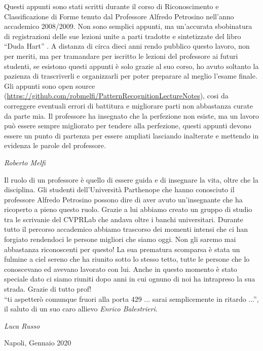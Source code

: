 %
%
%

\preface

Questi appunti sono stati scritti durante il corso di Riconoscimento e Classificazione di Forme tenuto dal Professore Alfredo Petrosino nell’anno accademico 2008/2009. Non sono semplici appunti, ma un’accurata sbobinatura di registrazioni delle sue lezioni unite a parti tradotte e sintetizzate del libro “Duda Hart” \cite{duda}. 
A distanza di circa dieci anni rendo pubblico questo lavoro, non per meriti, ma per tramandare per iscritto le lezioni del professore ai futuri studenti, se esistono questi appunti è solo grazie al suo corso, ho avuto soltanto la pazienza di trascriverli e organizzarli per poter preparare al meglio l’esame finale. \\
Gli appunti sono open source (\url{https://github.com/robmelfi/PatternRecognitionLectureNotes}), cosi da correggere eventuali errori di battitura e migliorare parti non abbastanza curate da parte mia. 
Il professore ha insegnato che la perfezione non esiste, ma un lavoro può essere sempre migliorato per tendere alla perfezione, questi appunti devono essere un punto di partenza per essere ampliati lasciando inalterate e mettendo in evidenza le parole del professore. 




\begin{flushright}\noindent
\hfill {\it Roberto Melfi}\\
\end{flushright}

\vspace{1cm}
\noindent Il ruolo di un professore è quello di essere guida e di insegnare la vita, oltre che la disciplina.
Gli studenti dell’Università Parthenope che hanno conosciuto il professore Alfredo Petrosino possono dire di aver avuto un’insegnante che ha ricoperto a pieno questo ruolo.
Grazie a lui abbiamo creato un gruppo di studio tra le scrivanie del CVPRLab che andava oltre i banchi universitari.
Durante tutto il percorso accademico abbiamo trascorso dei momenti intensi che ci han forgiato rendendoci le persone migliori che siamo oggi. Non gli saremo mai abbastanza riconoscenti per questo!
La sua prematura scomparsa è stata un fulmine a ciel sereno che ha riunito sotto lo stesso tetto, tutte le persone che lo conoscevano ed avevano lavorato con lui. Anche in questo momento è stato speciale dato ci siamo riuniti dopo anni in cui ognuno di noi ha intrapreso la sua strada.
Grazie di tutto prof!\\

“ti aspetterò comunque fruori alla porta 429 ... sarai semplicemente in ritardo ...”, il saluto di un suo caro allievo \emph{Enrico Balestrieri}.

\begin{flushright}\noindent
\hfill {\it Luca Russo}\\
\end{flushright}

\vspace{0.5cm}
Napoli, Gennaio 2020





